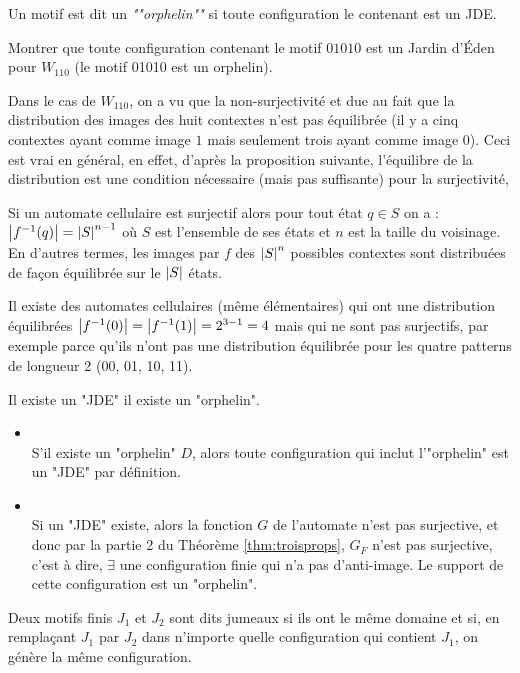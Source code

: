 \begin{definition}
	Un motif est dit un \emph{""orphelin""} si toute configuration le contenant est un JDE.
\end{definition}


\begin{exercice}
	Montrer que toute configuration contenant le motif $01010$ est un Jardin d'Éden pour $W_{110}$ (le motif 01010 est un orphelin).
\end{exercice}

Dans le cas de $W_{110}$, on a vu que la non-surjectivité et due au fait que la distribution des images des huit contextes n'est pas équilibrée (il y a cinq contextes ayant comme image $1$ mais seulement trois ayant comme image $0$). Ceci est vrai en général, en effet, d'après la proposition suivante,  l'équilibre de la distribution est une condition nécessaire (mais pas suffisante) pour la surjectivité, 
\begin{prop}
 Si un automate cellulaire est surjectif alors pour tout état $q \in S$ on a : $\left|f^{-1}(q)\right|=\left|S\right| ^{n-1}$ où $S$ est l'ensemble de ses états et $n$ est la taille du voisinage. En d'autres termes, les images par $f$ des $\left|S\right| ^{n}$ possibles contextes sont distribuées de façon équilibrée sur le $\left|S\right|$ états.
\end{prop}

 Il existe des automates cellulaires (même élémentaires) qui ont une distribution équilibrées $\left|f^{-1}(0)\right|=\left|f^{-1}(1)\right|=2^{3-1}= 4$ mais qui ne sont pas surjectifs, par exemple parce qu'ils n'ont pas une distribution équilibrée pour les quatre  patterns de longueur 2 (00, 01, 10, 11).


\begin{prop}
	Il existe un "JDE" \ssi il existe un "orphelin".
\end{prop}


\begin{proofI}
	\begin{itemize}
		\item \bimpRL\\
		      S'il existe un "orphelin" $D$, alors toute configuration qui inclut l'"orphelin" est un "JDE" par définition.
		\item \bimpLR\\
		      Si un "JDE" existe, alors la fonction $G$ de l'automate n'est pas surjective, et donc par la partie 2 du Théorème  \ref{thm:troisprops}, $G_F$ n'est pas surjective,
		      c'est à dire, $\exists$ une configuration finie qui n'a pas d'anti-image. Le support de cette configuration est  un "orphelin".
	\end{itemize}
\end{proofI}
\begin{definition}
	Deux motifs finis $J_1$ et $J_2$ sont dits jumeaux si ils ont le même domaine et si, en remplaçant $J_1$ par $J_2$ dans
	n'importe quelle configuration qui contient $J_1$, on génère la même configuration.
\end{definition}

